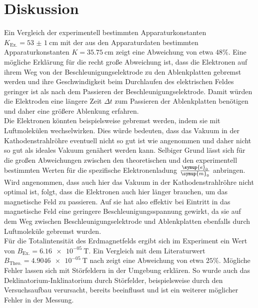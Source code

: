 \section{Diskussion}
\label{sec:Diskussion}
Ein Vergleich der experimentell bestimmten Apparaturkonstanten $K_\mathrm{Ex.}=\SI{53(1)}{\centi\meter}$ mit der aus den Apparaturdaten bestimmten Apparaturkonstanten $K=\SI{35.75}{\centi\meter}$ zeigt eine Abweichung von etwa $48\%$. Eine mögliche Erklärung für die recht große Abweichung ist, dass die Elektronen auf ihrem Weg von der Beschleunigungselektrode zu den Ablenkplatten gebremst werden und ihre Geschwindigkeit beim Durchlaufen des elektrischen Feldes geringer ist als nach dem Passieren der Beschleunigungselektrode. Damit würden die Elektroden eine längere Zeit $\Delta t$ zum Passieren der Ablenkplatten benötigen und daher eine größere Ablenkung erfahren.\\
Die Elektronen könnten beispielsweise gebremst werden, indem sie mit Luftmolekülen wechselwirken. Dies würde bedeuten, dass das Vakuum in der Kathodenstrahlröhre eventuell nicht so gut ist wie angenommen und daher nicht so gut als ideales Vakuum genähert werden kann.
Selbiger Grund lässt sich für die großen Abweichungen zwischen den theoretischen und den experimentell bestimmten Werten für die spezifische Elektronenladung $\frac{\symup{e}_0}{\symup{m}_0}$ anbringen. Wird angenommen, dass auch hier das Vakuum in der Kathodenstrahlröhre nicht optimal ist, folgt, dass die Elektronen auch hier länger brauchen, um das magnetische Feld zu passieren. Auf sie hat also effektiv bei Eintritt in das magnetische Feld eine geringere Beschleunigungsspannung gewirkt, da sie auf dem Weg zwischen Beschleunigungselektrode und Ablenkplatten ebenfalls durch Luftmoleküle gebremst wurden.
\\Für die Totalintensität des Erdmagnetfelds ergibt sich im Experiment ein Wert von $B_\mathrm{Ex.}=\SI{6.16e-05}{\tesla}$. Ein Vergleich mit dem Literaturwert $B_\mathrm{Theo.}=\SI{4.9046e-05}{\tesla}$ nach \cite{bob} zeigt eine Abweichung von etwa $25\%$. Mögliche Fehler lassen sich mit Störfeldern in der Umgebung erklären. So wurde auch das Deklinatorium-Inklinatorium durch Störfelder, beispielsweise durch den Versuchsaufbau verursacht, bereits beeinflusst und ist ein weiterer möglicher Fehler in der Messung.
